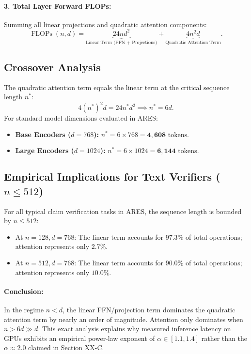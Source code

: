 \paragraph{3. Total Layer Forward FLOPs:}
Summing all linear projections and quadratic attention components:
\begin{equation}
\label{eq:transformer_flops}
\operatorname{FLOPs}(n, d) = \underbrace{24 n d^2}_{\text{Linear Term (FFN + Projections)}} + \underbrace{4 n^2 d}_{\text{Quadratic Attention Term}}.
\end{equation}

\subsection{Crossover Analysis}
The quadratic attention term equals the linear term at the critical sequence length $n^*$:
\begin{equation}
4 (n^*)^2 d = 24 n^* d^2 \implies n^* = 6d.
\end{equation}
For standard model dimensions evaluated in ARES:
\begin{itemize}
    \item \textbf{Base Encoders ($d = 768$):} $n^* = 6 \times 768 = \mathbf{4,608}\text{ tokens}$.
    \item \textbf{Large Encoders ($d = 1024$):} $n^* = 6 \times 1024 = \mathbf{6,144}\text{ tokens}$.
\end{itemize}

\subsection{Empirical Implications for Text Verifiers ($n \le 512$)}
For all typical claim verification tasks in ARES, the sequence length is bounded by $n \le 512$:
\begin{itemize}
    \item At $n = 128, d = 768$: The linear term accounts for $\mathbf{97.3\%}$ of total operations; attention represents only $\mathbf{2.7\%}$.
    \item At $n = 512, d = 768$: The linear term accounts for $\mathbf{90.0\%}$ of total operations; attention represents only $\mathbf{10.0\%}$.
\end{itemize}

\paragraph{Conclusion:} In the regime $n < d$, the linear FFN/projection term dominates the quadratic attention term by nearly an order of magnitude. Attention only dominates when $n > 6d \gg d$. This exact analysis explains why measured inference latency on GPUs exhibits an empirical power-law exponent of $\alpha \in [1.1, 1.4]$ rather than the $\alpha \approx 2.0$ claimed in Section XX-C.
